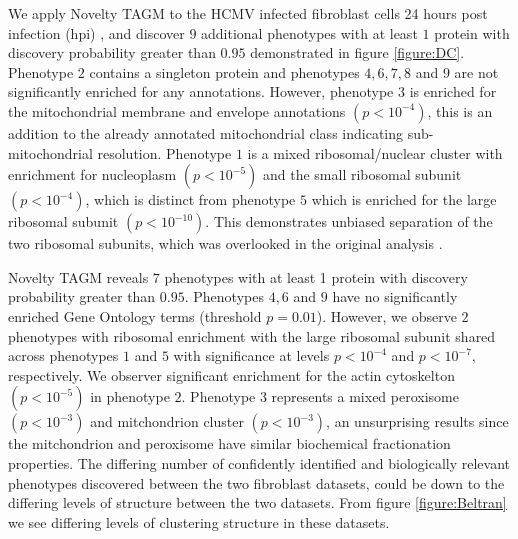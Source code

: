 \documentclass[12pt,english]{article}
\begin{document}
We apply Novelty TAGM to the HCMV infected fibroblast cells 24 hours post infection (hpi) \citep{Jean_Beltran:2016}, and discover $9$ additional phenotypes with at least $1$ protein with discovery probability greater than $0.95$ demonstrated in figure \ref{figure:DC}. Phenotype $2$ contains a singleton protein and phenotypes $4,6,7,8$ and $9$ are not significantly enriched for any annotations. However, phenotype $3$ is enriched for the mitochondrial membrane and envelope annotations $(p < 10^{-4})$, this is an addition to the already annotated mitochondrial class indicating sub-mitochondrial resolution. Phenotype $1$ is a mixed ribosomal/nuclear cluster with enrichment for nucleoplasm $(p < 10^{-5})$ and the small ribosomal subunit $(p < 10^{-4})$, which is distinct from phenotype $5$ which is enriched for the large ribosomal subunit $(p < 10^{-10})$. This demonstrates unbiased separation of the two ribosomal subunits, which was overlooked in the original analysis \citep{Jean_Beltran:2016}.

Novelty TAGM reveals $7$ phenotypes with at least 1 protein with discovery probability greater than $0.95$. Phenotypes $4,6$ and $9$ have no significantly enriched Gene Ontology terms (threshold $p = 0.01$). However, we observe $2$ phenotypes with ribosomal enrichment with the large ribosomal subunit shared across phenotypes $1$ and $5$ with significance at levels $p < 10^{-4}$ and $p < 10^{-7} $, respectively. We observer significant enrichment for the actin cytoskelton $(p < 10^{-5})$ in phenotype $2$. Phenotype $3$ represents a mixed peroxisome $(p < 10^{-3})$ and mitchondrion cluster $(p < 10 ^{-3})$, an unsurprising results since the mitchondrion and peroxisome have similar biochemical fractionation properties. The differing number of confidently identified and biologically relevant phenotypes discovered between the two fibroblast datasets, could be down to the differing levels of structure between the two datasets. From figure \ref{figure:Beltran} we see differing levels of clustering structure in these datasets.
\end{document}
